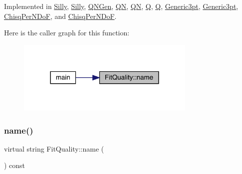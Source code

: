 Implemented in \mbox{\hyperlink{classSilly_a090ed776bc4cf29f2ad8802242090b59}{Silly}}, \mbox{\hyperlink{classSilly_a090ed776bc4cf29f2ad8802242090b59}{Silly}}, \mbox{\hyperlink{classQNGen_a9fcf4cc02a027c054a889421898175fa}{Q\+N\+Gen}}, \mbox{\hyperlink{classQN_ad80e962cb22f614fd9946e5cf1432e19}{QN}}, \mbox{\hyperlink{classQN_ad80e962cb22f614fd9946e5cf1432e19}{QN}}, \mbox{\hyperlink{classQ_a31d9d5bc680b063c2f80238795c7a6c0}{Q}}, \mbox{\hyperlink{classQ_a31d9d5bc680b063c2f80238795c7a6c0}{Q}}, \mbox{\hyperlink{classGeneric3pt_a669b462af539bd13514447ed387f0644}{Generic3pt}}, \mbox{\hyperlink{classGeneric3pt_a669b462af539bd13514447ed387f0644}{Generic3pt}}, \mbox{\hyperlink{classChisqPerNDoF_a69870fb2d2f84fa15665bbc384cb1cf7}{Chisq\+Per\+N\+DoF}}, and \mbox{\hyperlink{classChisqPerNDoF_a69870fb2d2f84fa15665bbc384cb1cf7}{Chisq\+Per\+N\+DoF}}.

Here is the caller graph for this function\+:
\nopagebreak
\begin{figure}[H]
\begin{center}
\leavevmode
\includegraphics[width=242pt]{df/d8d/classFitQuality_a3423e236f25d68cf822094b363a74780_icgraph}
\end{center}
\end{figure}
\mbox{\label{classFitQuality_a3423e236f25d68cf822094b363a74780}} 
\subsubsection{\texorpdfstring{name()}{name()}\hspace{0.1cm}{\footnotesize\ttfamily [2/2]}}
{\footnotesize\ttfamily virtual string Fit\+Quality\+::name (\begin{DoxyParamCaption}{ }\end{DoxyParamCaption}) const\hspace{0.3cm}{\ttfamily [pure virtual]}}



